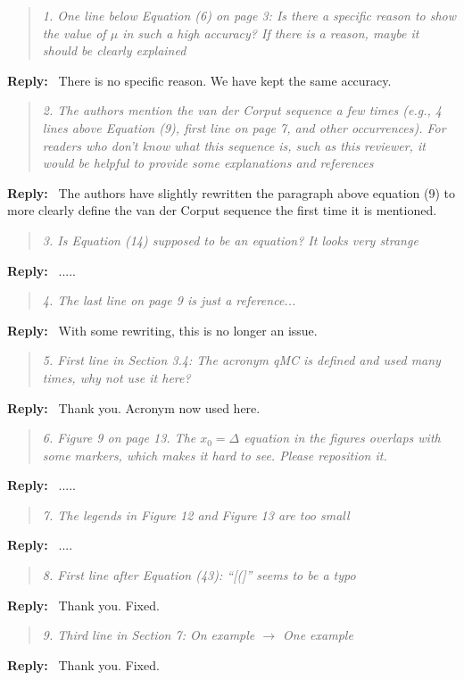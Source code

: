 \documentclass[11pt]{article}
\newenvironment{response}{%
  \vspace{1em}
  \begin{quote}\itshape
}{%
  \end{quote}
  \noindent\textbf{Reply:}~
}
\begin{document}
\begin{response}{1.}
    One line below Equation (6) on page 3: Is there a specific reason to show the value of $\mu$ in such a high accuracy? If there is a reason, maybe it should be clearly explained
\end{response}
There is no specific reason. We have kept the same accuracy.


\begin{response}{2.}
    The authors mention the van der Corput sequence a few times (e.g., 4 lines above Equation (9), first line on page 7, and other occurrences). For readers who don’t know what this sequence is, such as this reviewer, it would be helpful to provide some explanations and references
\end{response}
The authors have slightly rewritten the paragraph above equation (9) to more clearly define the van der Corput sequence the first time it is mentioned.


\begin{response}{3.}
    Is Equation (14) supposed to be an equation? It looks very strange
\end{response}
.....


\begin{response}{4.}
    The last line on page 9 is just a reference...
\end{response}
With some rewriting, this is no longer an issue.

\begin{response}{5.}
    First line in Section 3.4: The acronym qMC is defined and used many times, why not use it here?
\end{response}
    Thank you. Acronym now used here.


\begin{response}{6.}
    Figure 9 on page 13. The $x_0 = \Delta$ equation in the figures overlaps with some markers, which makes it hard to see. Please reposition it.
\end{response}
.....



\begin{response}{7.}
    The legends in Figure 12 and Figure 13 are too small
\end{response}
....


\begin{response}{8.}
    First line after Equation (43): “[(]” seems to be a typo
\end{response}
Thank you. Fixed.


\begin{response}{9.}
    Third line in Section 7: On example $\rightarrow$ One example
\end{response}
Thank you. Fixed.
\end{document}
